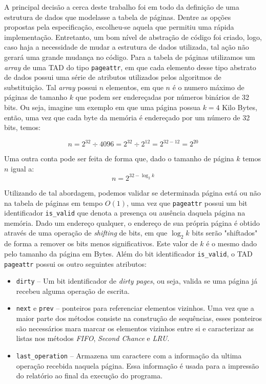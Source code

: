 
A principal decisão a cerca deste trabalho foi em todo da definição de uma
estrutura de dados que modelasse a tabela de páginas.
Dentre as opções propostas pela especificação, escolheu-se aquela que permitiu
uma rápida implementação.
Entretanto, um bom nível de abstração de código foi criado, logo, caso
haja a necessidade de mudar a estrutura de dados utilizada, tal ação não gerará
uma grande mudança no código.
Para a tabela de páginas utilizamos um \textit{array} de uma TAD do tipo
\texttt{pageattr}, em que cada elemento desse tipo abstrato de dados possui uma
série de atributos utilizados pelos algoritmos de substituição.
Tal \textit{array} possui $n$ elementos, em que $n$ é o numero máximo de páginas
de tamanho $k$ que podem ser endereçadas por números binários de 32 bits.
Ou seja, imagine um exemplo em que uma página possua $k = 4$ Kilo Bytes, então,
uma vez que cada byte da memória é endereçado por um número de 32 bits, temos:

$$
n = 2^{32} \div 4096 = 2^{32} \div 2^{12} = 2^{32-12} = 2^{20}
$$

Uma outra conta pode ser feita de forma que, dado o tamanho de página $k$ temos
$n$ igual a:
$$
n = 2^{32 - \log_2{k}}
$$


Utilizando de tal abordagem, podemos validar se determinada página está ou não
na tabela de páginas em tempo $O(1)$, uma vez que \texttt{pageattr} possui um
bit identificador \texttt{is\_valid} que denota a presença ou ausência daquela
página na memória.
Dado um endereço qualquer, o endereço de sua própria página é obtido através de
uma operação de \textit{shifting} de bits, em que $\log_2k$ bits serão "shiftados"
de forma a remover os bits menos significativos.
Este valor de $k$ é o mesmo dado pelo tamanho da página em Bytes.
Além do bit identificador \texttt{is\_valid}, o TAD \texttt{pageattr} possui os
outro seguintes atributos:
\begin{itemize}
    \item \texttt{dirty} -- Um bit identificador de \textit{dirty pages}, ou
    seja, valida se uma página já recebeu alguma operação de escrita.
    \item \texttt{next} e \texttt{prev} -- ponteiros para referenciar elementos
    vizinhos.
    Uma vez que a maior parte dos métodos consiste na construção de sequências,
    esses ponteiros são necessários mara marcar os elementos vizinhos entre si
    e caracterizar as listas nos métodos \textit{FIFO}, \textit{Second Chance}
    e \textit{LRU}.
    \item \texttt{last\_operation} -- Armazena um caractere com a informação da
    ultima operação recebida naquela página.
    Essa informação é usada para a impressão do relatório ao final da execução
    do programa.
\end{itemize}


